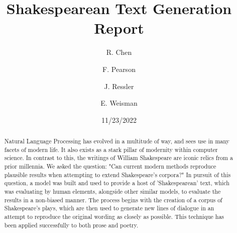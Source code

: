 \documentclass[11pt,a4paper]{article}
\begin{document}
\title{Shakespearean Text Generation Report}

\author{  R. Chen \\\and F. Pearson \\\and J. Ressler \\\and E. Weisman }



\maketitle



\date{11/23/2022}

\begin{abstract}
Natural Language Processing has evolved in a multitude of way, and sees use in many facets of modern life. It also exists as a stark pillar of modernity within computer science. In contrast to this, the writings of William Shakespeare are iconic relics from a prior millennia. We asked the question: "Can current modern methods reproduce plausible results when attempting to extend Shakespeare's corpora?" In pursuit of this question, a model was built and used to provide a host of 'Shakespearean' text, which was evaluating by human elements, alongside other similar models, to evaluate the results in a non-biased manner. The process begins with the creation of a corpus of Shakespeare's plays, which are then used to generate new lines of dialogue in an attempt to reproduce the original wording as closely as possible. This technique has been applied successfully to both prose and poetry.

\end{abstract}
\end{document}
